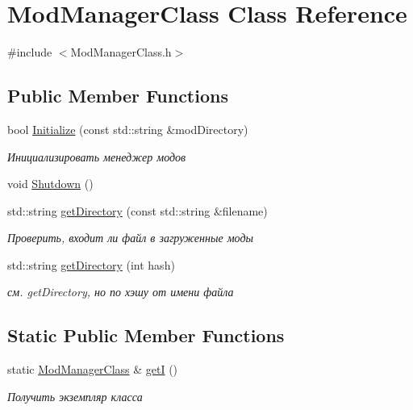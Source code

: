 \hypertarget{class_mod_manager_class}{}\section{Mod\+Manager\+Class Class Reference}
\label{class_mod_manager_class}


{\ttfamily \#include $<$Mod\+Manager\+Class.\+h$>$}

\subsection*{Public Member Functions}
\begin{DoxyCompactItemize}
\item 
bool \hyperlink{class_mod_manager_class_a46a072f485ab9383d3cfa7a718cc5797}{Initialize} (const std\+::string \&mod\+Directory)
\begin{DoxyCompactList}\small\item\em Инициализировать менеджер модов \end{DoxyCompactList}\item 
void \hyperlink{class_mod_manager_class_a88d010eb65a2c69f2aff8d8b4a8ebbc0}{Shutdown} ()
\item 
std\+::string \hyperlink{class_mod_manager_class_a3a1876a333b15822a5c25ec85a9cfab5}{get\+Directory} (const std\+::string \&filename)
\begin{DoxyCompactList}\small\item\em Проверить, входит ли файл в загруженные моды \end{DoxyCompactList}\item 
std\+::string \hyperlink{class_mod_manager_class_a38478a4eb5ddd9746806649b24edbd5f}{get\+Directory} (int hash)
\begin{DoxyCompactList}\small\item\em см. get\+Directory, но по хэшу от имени файла \end{DoxyCompactList}\end{DoxyCompactItemize}
\subsection*{Static Public Member Functions}
\begin{DoxyCompactItemize}
\item 
static \hyperlink{class_mod_manager_class}{Mod\+Manager\+Class} \& \hyperlink{class_mod_manager_class_adeaeac4e6df4e887b5d6871347348267}{getI} ()
\begin{DoxyCompactList}\small\item\em Получить экземпляр класса \end{DoxyCompactList}\end{DoxyCompactItemize}
